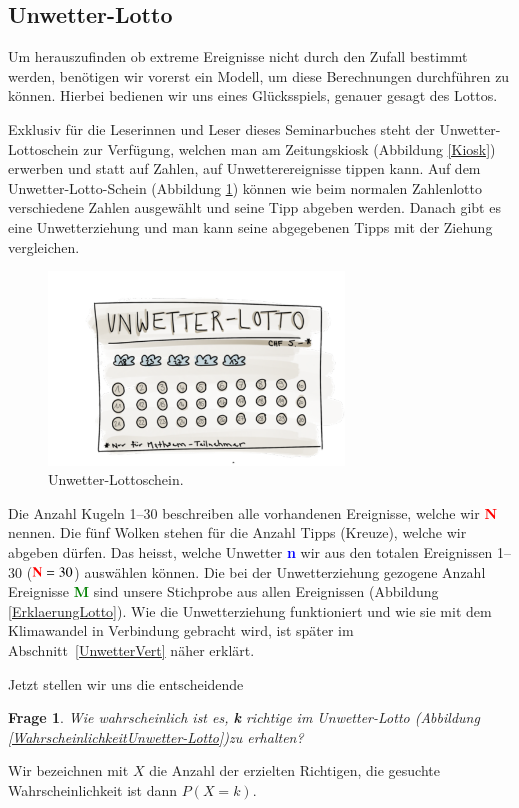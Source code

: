 \begin{refsection}
\section{Unwetter-Lotto}
Um herauszufinden ob extreme Ereignisse nicht durch den Zufall bestimmt werden, benötigen wir vorerst ein Modell, um diese Berechnungen durchführen zu können.
Hierbei bedienen wir uns eines Glücksspiels, genauer gesagt des Lottos.

Exklusiv für die Leserinnen und Leser dieses Seminarbuches steht der Unwetter-Lottoschein zur Verfügung, welchen man am Zeitungskiosk (Abbildung \ref{Kiosk}) erwerben und statt auf Zahlen, auf Unwetterereignisse tippen kann. Auf dem Unwetter-Lotto-Schein (Abbildung \ref{Lottoschein}) können wie beim normalen Zahlenlotto verschiedene Zahlen ausgewählt und seine Tipp abgeben werden. Danach gibt es eine Unwetterziehung und man kann seine abgegebenen Tipps mit der Ziehung vergleichen.

\begin{figure}
\centering
\includegraphics[width=0.7\textwidth]{extrem/Lottoschein.pdf}
\caption{Unwetter-Lottoschein.}
\label{Lottoschein}
\end{figure}

Die Anzahl Kugeln 1--30 beschreiben alle vorhandenen Ereignisse,
welche wir \textcolor{red}{\textbf{N}} nennen. Die fünf Wolken
stehen für die Anzahl Tipps (Kreuze), welche wir abgeben dürfen.
Das heisst, welche Unwetter \textcolor{blue}{\textbf{n}} wir aus
den totalen Ereignissen 1--30 ($\textcolor{red}{\textbf{N}}=30$)
auswählen können. Die bei der Unwetterziehung gezogene Anzahl Ereignisse
\textcolor{green}{\textbf{M}} sind unsere Stichprobe aus allen
Ereignissen (Abbildung \ref{ErklaerungLotto}). Wie die Unwetterziehung
funktioniert und wie sie mit dem Klimawandel in Verbindung gebracht
wird, ist später im Abschnitt~\ref{UnwetterVert} näher erklärt.

Jetzt stellen wir uns die entscheidende
\newtheorem{frage}[satz]{Frage}
\begin{frage}
Wie wahrscheinlich ist es, \textcolor{darkyellow}{\textbf{k}} richtige
im Unwetter-Lotto (Abbildung \ref{WahrscheinlichkeitUnwetter-Lotto})zu
erhalten?
\end{frage}
Wir bezeichnen mit $X$ die Anzahl der erzielten Richtigen,
die gesuchte Wahrscheinlichkeit ist dann $P(X=k)$.


\end{refsection}
